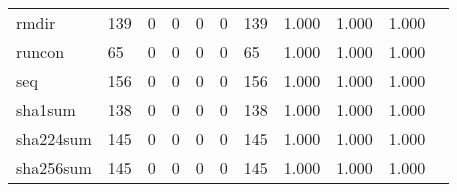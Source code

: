\begin{longtable}{lp{1.2cm}p{1.2cm}p{1.2cm}p{1.2cm}p{1.2cm}p{1.2cm}p{1.2cm}p{1.2cm}p{1.2cm}p{1.2cm}}
rmdir     &                                   139 &                                                  0 &                                                  0 &                                                  0 &                                                  0 &                                                139 &                                              1.000 &                                              1.000 &                                              1.000 \\
runcon    &                                    65 &                                                  0 &                                                  0 &                                                  0 &                                                  0 &                                                 65 &                                              1.000 &                                              1.000 &                                              1.000 \\
seq       &                                   156 &                                                  0 &                                                  0 &                                                  0 &                                                  0 &                                                156 &                                              1.000 &                                              1.000 &                                              1.000 \\
sha1sum   &                                   138 &                                                  0 &                                                  0 &                                                  0 &                                                  0 &                                                138 &                                              1.000 &                                              1.000 &                                              1.000 \\
sha224sum &                                   145 &                                                  0 &                                                  0 &                                                  0 &                                                  0 &                                                145 &                                              1.000 &                                              1.000 &                                              1.000 \\
sha256sum &                                   145 &                                                  0 &                                                  0 &                                                  0 &                                                  0 &                                                145 &                                              1.000 &                                              1.000 &                                              1.000 \\

\end{longtable}
